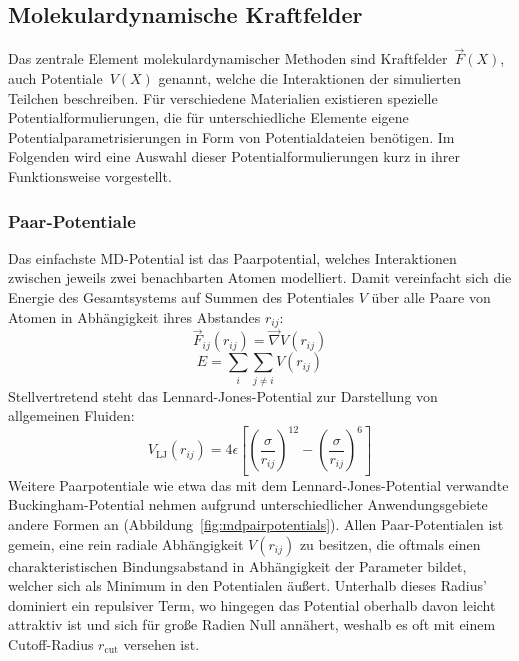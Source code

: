 \subsection{Molekulardynamische Kraftfelder}
\label{mdforcefields}

Das zentrale Element molekulardynamischer Methoden sind Kraftfelder~$\vec F(X)$, auch Potentiale~$V(X)$ genannt, welche die Interaktionen der simulierten Teilchen beschreiben\cite{hoover_molecular_1986}.
Für verschiedene Materialien existieren spezielle Potentialformulierungen, die für unterschiedliche Elemente eigene Potentialparametrisierungen in Form von Potentialdateien benötigen.
Im Folgenden wird eine Auswahl dieser Potentialformulierungen kurz in ihrer Funktionsweise vorgestellt.

\subsubsection{Paar-Potentiale}

Das einfachste MD-Potential ist das Paarpotential, welches Interaktionen zwischen jeweils zwei benachbarten Atomen modelliert.
Damit vereinfacht sich die Energie des Gesamtsystems auf Summen des Potentiales $V$ über alle Paare von Atomen in Abhängigkeit ihres Abstandes $r_{ij}$:
\begin{equation}
  \vec F_{ij}(r_{ij}) = \vec\nabla V(r_{ij})
\end{equation}
\begin{equation}
  E = \sum_i\sum_{j \neq i}{V(r_{ij})}
\end{equation}
Stellvertretend steht das Lennard-Jones-Potential zur Darstellung von allgemeinen Fluiden:
\begin{equation}
  V_\text{LJ}(r_{ij}) = 4 \epsilon \left[\left(\frac{\sigma}{r_{ij}}\right)^{12} - \left(\frac{\sigma}{r_{ij}}\right)^{6}\right]
\end{equation}
Weitere Paarpotentiale wie etwa das mit dem Lennard-Jones-Potential verwandte Bucking\-ham-Potential nehmen aufgrund unterschiedlicher Anwendungsgebiete andere Formen an (Abbildung~\ref{fig:mdpairpotentials}).
Allen Paar-Potentialen ist gemein, eine rein radiale Abhängigkeit $V(r_{ij})$ zu besitzen, die oftmals einen charakteristischen Bindungsabstand in Abhängigkeit der Parameter bildet, welcher sich als Minimum in den Potentialen äußert.
Unterhalb dieses Radius' dominiert ein repulsiver Term, wo hingegen das Potential oberhalb davon leicht attraktiv ist und sich für große Radien Null annähert, weshalb es oft mit einem Cutoff-Radius $r_\text{cut}$ versehen ist.


